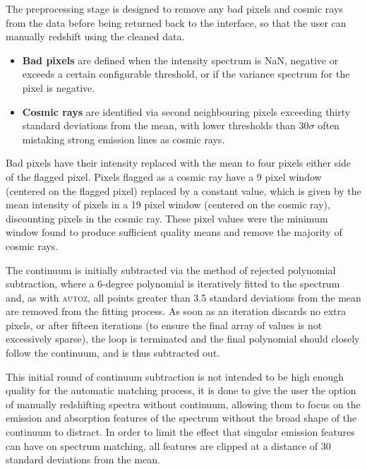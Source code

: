 \documentclass[5p]{elsarticle}
\newcommand{\autoz}{\textsc{autoz}}
\begin{document}
The preprocessing stage is designed to remove any bad pixels and cosmic rays from the data before being returned back to the interface, so that the user can manually redshift using the cleaned data.
\begin{itemize}
\item \textbf{Bad pixels} are defined when the intensity spectrum is NaN, negative or exceeds a certain configurable threshold, or if the variance spectrum for the pixel is negative.
\item \textbf{Cosmic rays} are identified via second neighbouring pixels exceeding thirty standard deviations from the mean, with lower thresholds than $30\sigma$ often mistaking strong emission lines as cosmic rays. 
\end{itemize}
Bad pixels have their intensity replaced with the mean to four pixels either side of the flagged pixel. Pixels flagged as a cosmic ray have a 9 pixel window (centered on the flagged pixel) replaced by a constant value, which is given by the mean intensity of pixels in a 19 pixel window (centered on the cosmic ray), discounting pixels in the cosmic ray. These pixel values were the minimum window found to produce sufficient quality means and remove the majority of cosmic rays.

The continuum is initially subtracted via the method of rejected polynomial subtraction, where a 6-degree polynomial is iteratively fitted to the spectrum and, as with \autoz{}, all points greater than 3.5 standard deviations from the mean are removed from the fitting process. As soon as an iteration discards no extra pixels, or after fifteen iterations (to ensure the final array of values is not excessively sparse), the loop is terminated and the final polynomial should closely follow the continuum, and is thus subtracted out.

This initial round of continuum subtraction is not intended to be high enough quality for the automatic matching process, it is done to give the user the option of manually redshifting spectra without continuum, allowing them to focus on the emission and absorption features of the spectrum without the broad shape of the continuum to distract. In order to limit the effect that singular emission features can have on spectrum matching, all features are clipped at a distance of 30 standard deviations from the mean.\\
\end{document}
